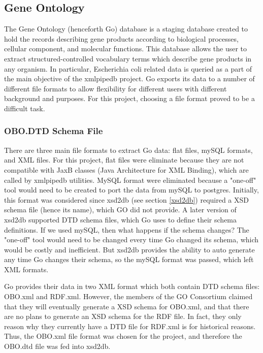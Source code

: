 %


\subsection{Gene Ontology}
The Gene Ontology (henceforth Go) database is a staging database created to hold the records describing gene products according to biological processes,
cellular component, and molecular functions. This database allows the user to extract structured-controlled vocabulary terms
which describe gene products in any organism. In particular, Escherichia coli related data is queried as a part of the main
objective of the xmlpipedb project. Go exports its data to a number of different file formats to allow flexibility for different users with
different background and purposes. For this project, choosing a file format proved to be a difficult task.

\subsubsection{OBO.DTD Schema File}
\label{godtd}
There are three main file formats to extract Go data: flat files, mySQL formats, and XML files. For this project,
flat files were eliminate because they are not compatible with JaxB classes (Java Architecture for XML Binding), which  are called by
xmlpipedb utilities. MySQL format were eliminated because a "one-off" tool would need
to be created to port the data from mySQL to postgres. Initially, this format was considered since xsd2db
(see section \ref{xsd2db}) required a XSD
schema file (hence its name), which GO did not provide. A later version of xsd2db supported DTD schema files, which Go uses to define their
schema definitions. If we used mySQL, then what happens if the schema changes? The "one-off" tool would need to be changed every
time Go changed its schema, which would be costly and inefficient. But xsd2db provides the ability to auto generate any time Go changes
their schema, so the mySQL format was passed, which left XML formats.

Go provides their data in two XML format which both contain DTD schema files: OBO.xml and RDF.xml. However,
the members of the GO Consortium claimed that they will eventually generate a XSD schema for OBO.xml, and that there
are no plans to generate an XSD schema for the RDF file. In fact, they only reason why they currently have a DTD file
for RDF.xml is for historical reasons. Thus, the OBO.xml file format
was chosen for the project, and therefore the OBO.dtd file was fed into xsd2db.

